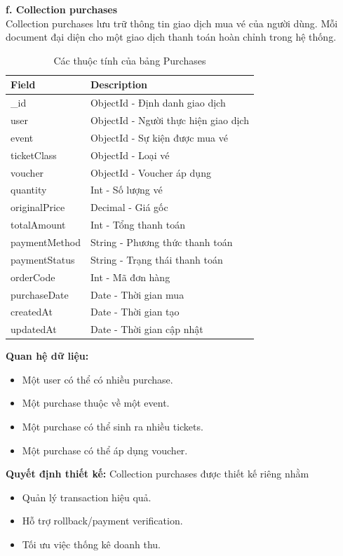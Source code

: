\textbf{f. Collection purchases}\\
Collection purchases lưu trữ thông tin giao dịch mua vé của người dùng.
Mỗi document đại diện cho một giao dịch thanh toán hoàn chỉnh trong hệ thống.
\setlength{\LTleft}{0pt}
\setlength{\LTright}{0pt}
\begin{longtable}{|p{4cm}|p{11.2cm}|}
\caption{Các thuộc tính của bảng Purchases}\\[15pt]
\hline
\textbf{Field} & \textbf{Description} \\ \hline
\_id & ObjectId - Định danh giao dịch \\ \hline
user & ObjectId - Người thực hiện giao dịch \\ \hline
event & ObjectId - Sự kiện được mua vé \\ \hline
ticketClass & ObjectId - Loại vé \\ \hline
voucher & ObjectId - Voucher áp dụng \\ \hline
quantity & Int - Số lượng vé \\ \hline
originalPrice & Decimal - Giá gốc \\ \hline
totalAmount & Int - Tổng thanh toán \\ \hline
paymentMethod & String - Phương thức thanh toán \\ \hline
paymentStatus & String - Trạng thái thanh toán \\ \hline
orderCode & Int - Mã đơn hàng \\ \hline
purchaseDate & Date - Thời gian mua \\ \hline
createdAt & Date - Thời gian tạo \\ \hline
updatedAt & Date - Thời gian cập nhật \\ \hline
\end{longtable}
\textbf{Quan hệ dữ liệu:}
\begin{itemize}
    \item[-] Một user có thể có nhiều purchase.
    \item[-] Một purchase thuộc về một event.
    \item[-] Một purchase có thể sinh ra nhiều tickets.
    \item[-] Một purchase có thể áp dụng voucher.
\end{itemize}
\textbf{Quyết định thiết kế:} Collection purchases được thiết kế riêng nhằm
\begin{itemize}
    \item[-] Quản lý transaction hiệu quả.
    \item[-] Hỗ trợ rollback/payment verification.
    \item[-] Tối ưu việc thống kê doanh thu.
\end{itemize}

